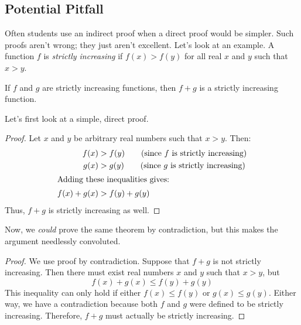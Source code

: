 \begin{editingnotes}

\subsection{Potential Pitfall}

Often students use an indirect proof when a direct proof would be
simpler.  Such proofs aren't wrong; they just aren't excellent.  Let's
look at an example.  A function $f$ is \textit{strictly increasing} if
$f(x) > f(y)$ for all real $x$ and $y$ such that $x > y$.

\begin{theorem}
If $f$ and $g$ are strictly increasing functions, then $f + g$ is a
strictly increasing function.
\end{theorem}

Let's first look at a simple, direct proof.

\begin{proof}
Let $x$ and $y$ be arbitrary real numbers such that $x > y$.  Then:
\begin{align*}
f(x) & > f(y) \qquad \text{(since $f$ is strictly increasing)} \\
g(x) & > g(y) \qquad \text{(since $g$ is strictly increasing)} \\
\intertext{Adding these inequalities gives:}
f(x) + g(x) & > f(y) + g(y)
\end{align*}
Thus, $f + g$ is strictly increasing as well.
\end{proof}

Now, we \textit{could} prove the same theorem by contradiction, but
this makes the argument needlessly convoluted.

\begin{proof}
We use proof by contradiction.  Suppose that $f + g$ is not strictly
increasing.  Then there must exist real numbers $x$ and $y$ such that
$x > y$, but
%
\[
f(x) + g(x) \leq f(y) + g(y)
\]
%
This inequality can only hold if either $f(x) \leq f(y)$ or $g(x) \leq
g(y)$.  Either way, we have a contradiction because both $f$ and $g$
were defined to be strictly increasing.  Therefore, $f + g$ must
actually be strictly increasing.
\end{proof}

\end{editingnotes}

\begin{problems}
\practiceproblems
{}

\classproblems
{}

\homeworkproblems
{}

\examproblems
{}

\end{problems}

